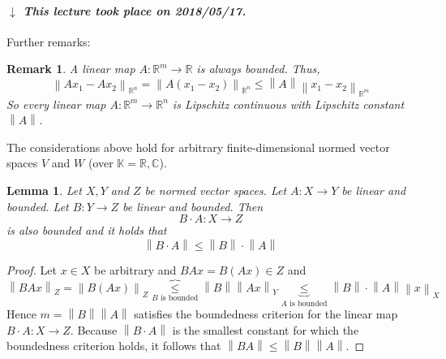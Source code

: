 \documentclass{article}
\newtheorem{lemma}{Lemma}  \numberwithin{lemma}{section}
\newtheorem{remark}{Remark}  \numberwithin{remark}{section}
\newcommand{\norm}[1]{\left\|#1\right\|}
\newcommand{\dateref}[1]{%
  \begin{mdframed}[backgroundcolor=gray!10,innerbottommargin=0pt,innertopmargin=0pt]
    \paragraph{\textit{$\downarrow$ This lecture took place on #1.}}%
  \end{mdframed}%
}
\begin{document}
\dateref{2018/05/17}

Further remarks:
\begin{remark}
  A linear map $A: \mathbb R^m \to \mathbb R$ is always bounded. Thus,
  \[ \norm{Ax_1 - Ax_2}_{\mathbb R^n} = \norm{A(x_1 - x_2)}_{\mathbb R^n} \leq \norm{A} \norm{x_1 - x_2}_{\mathbb R^m} \]
  So every linear map $A: \mathbb R^m \to \mathbb R^n$ is Lipschitz \emph{continuous} with Lipschitz constant $\norm{A}$.
\end{remark}

The considerations above hold for arbitrary finite-dimensional normed vector spaces $V$ and $W$ (over $\mathbb K = \mathbb R, \mathbb C$).

\begin{lemma} %
  Let $X, Y$ and $Z$ be normed vector spaces.
  Let $A: X \to Y$ be linear and bounded. Let $B: Y \to Z$ be linear and bounded.
  Then
  \[ B \cdot A: X \to Z \]
  is also bounded and it holds that
  \[ \norm{B \cdot A} \leq \norm{B} \cdot \norm{A} \]
\end{lemma}

\begin{proof}
  Let $x \in X$ be arbitrary and $BAx = B(Ax) \in Z$ and
  \[ \norm{BAx}_Z = \norm{B(Ax)}_Z \overbrace{\leq}_{B \text{ is bounded}} \norm{B} \norm{Ax}_Y \underbrace{\leq}_{A \text{ is bounded}} \norm{B} \cdot \norm{A} \norm{x}_X \]
  Hence $m = \norm B \norm A$ satisfies the boundedness criterion for the linear map $B \cdot A: X \to Z$. Because $\norm{B\cdot A}$ is the smallest constant
  for which the boundedness criterion holds, it follows that $\norm{BA} \leq \norm B \norm A$.
\end{proof}
\end{document}
